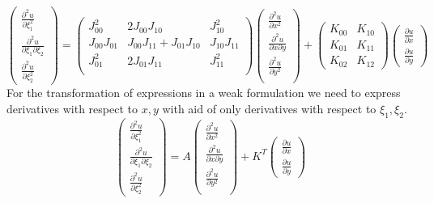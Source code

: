 \documentclass[a4paper,12pt]{article}
\begin{document}
$$
\left(\begin{array}{c}
\frac{\partial^2 u}{\partial \xi_1^2} \\[3mm]
\frac{\partial^2 u}{\partial \xi_1 \partial \xi_2} \\[3mm]
\frac{\partial^2 u}{\partial \xi_2^2} 
\end{array}\right) =
\left(\begin{array}{ccc}
J_{00}^2 & 2J_{00}J_{10} & J_{10}^2 \\[3mm] 
J_{00}J_{01} & J_{00}J_{11} + J_{01}J_{10} & J_{10}J_{11} \\[3mm] 
J_{01}^2 & 2J_{01}J_{11} & J_{11}^2 \\[3mm] 
\end{array}\right) 
\left(\begin{array}{c}
\frac{\partial^2 u}{\partial x^2} \\[3mm]
\frac{\partial^2 u}{\partial x \partial y} \\[3mm]
\frac{\partial^2 u}{\partial y^2} \\[3mm]
\end{array}\right) + 
\left(\begin{array}{cc}
K_{00} & K_{10}\\[3mm]
K_{01} & K_{11}\\[3mm]
K_{02} & K_{12}
\end{array}\right) 
\left(\begin{array}{c}
\frac{\partial u}{\partial x} \\[3mm]
\frac{\partial u}{\partial y}
\end{array}\right)
$$
For the transformation of expressions in a weak formulation we need to express derivatives with respect to $x,y$ with aid of only derivatives with respect to $\xi_1, \xi_2$.
$$
\left(\begin{array}{c}
\frac{\partial^2 u}{\partial \xi_1^2} \\[3mm]
\frac{\partial^2 u}{\partial \xi_1 \partial \xi_2} \\[3mm]
\frac{\partial^2 u}{\partial \xi_2^2} 
\end{array}\right) =
A
\left(\begin{array}{c}
\frac{\partial^2 u}{\partial x^2} \\[3mm]
\frac{\partial^2 u}{\partial x \partial y} \\[3mm]
\frac{\partial^2 u}{\partial y^2} \\[3mm]
\end{array}\right) + 
K^T
\left(\begin{array}{c}
\frac{\partial u}{\partial x} \\[3mm]
\frac{\partial u}{\partial y}
\end{array}\right)
$$
\end{document}
